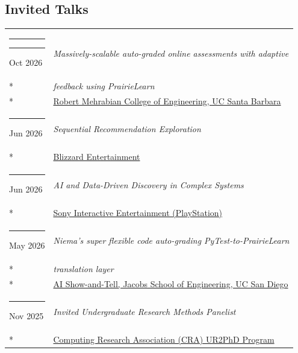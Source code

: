\documentclass[margin,line]{res}
\begin{document}
\begin{resume}
\section{\sc Invited Talks}
\begin{longtable}{@{}p{0.7in}p{4in}}\rule{-1mm}{4.5mm}
\hspace*{-4mm} \rule{-1mm}{5mm} Oct 2026 & \textit{Massively-scalable auto-graded online assessments with adaptive}\\*
\hspace*{-4mm} & \hspace{4mm} \textit{feedback using PrairieLearn}\\*
\hspace*{-4mm} & \hspace{4mm} \href{https://engineering.ucsb.edu/}{Robert Mehrabian College of Engineering, UC Santa Barbara}\\
\hspace*{-4mm} \rule{-1mm}{5mm} Jun 2026 & \textit{Sequential Recommendation Exploration}\\*
\hspace*{-4mm} & \hspace{4mm} \href{https://www.blizzard.com/}{Blizzard Entertainment}\\
\hspace*{-4mm} \rule{-1mm}{5mm} Jun 2026 & \textit{AI and Data-Driven Discovery in Complex Systems}\\*
\hspace*{-4mm} & \hspace{4mm} \href{https://sonyinteractive.com/}{Sony Interactive Entertainment (PlayStation)}\\
\hspace*{-4mm} \rule{-1mm}{5mm} May 2026 & \textit{Niema's super flexible code auto-grading PyTest-to-PrairieLearn}\\*
\hspace*{-4mm} & \hspace{4mm} \textit{translation layer}\\*
\hspace*{-4mm} & \hspace{4mm} \href{https://stevenjswanson.github.io/JSOE-AI-Show-and-Tell/}{AI Show-and-Tell, Jacobs School of Engineering, UC San Diego}\\
\hspace*{-4mm} \rule{-1mm}{5mm} Nov 2025 & \textit{Invited Undergraduate Research Methods Panelist}\\*
\hspace*{-4mm} & \hspace{4mm} \href{https://cra.org/ur2phd}{Computing Research Association (CRA) UR2PhD Program}\\

\end{longtable}
\end{resume}
\end{document}
